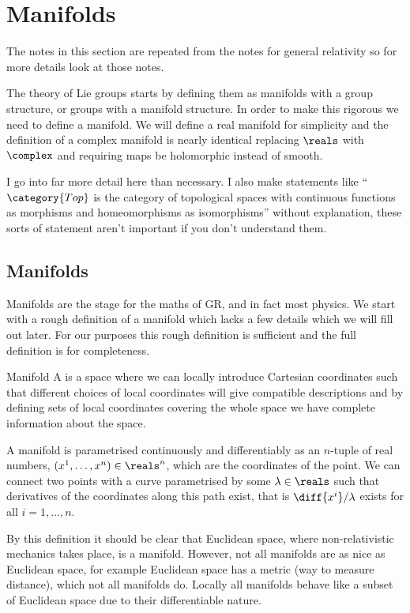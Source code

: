 \chapter{Manifolds}\label{app:manifold}
\begin{rmk}
    The notes in this section are repeated from the notes for general relativity so for more details look at those notes.
\end{rmk}
The theory of Lie groups starts by defining them as manifolds with a group structure, or groups with a manifold structure.
In order to make this rigorous we need to define a manifold.
We will define a real manifold for simplicity and the definition of a complex manifold is nearly identical replacing \(\reals\) with \(\complex\) and requiring maps be holomorphic instead of smooth.

I go into far more detail here than necessary.
I also make statements like \enquote{\(\category{Top}\) is the category of topological spaces with continuous functions as morphisms and homeomorphisms as isomorphisms} without explanation, these sorts of statement aren't important if you don't understand them.

\section{Manifolds}
Manifolds are the stage for the maths of GR, and in fact most physics.
We start with a rough definition of a manifold which lacks a few details which we will fill out later.
For our purposes this rough definition is sufficient and the full definition is for completeness.
\begin{dfn}{Manifold}{}
    A  is a space where we can locally introduce Cartesian coordinates such that different choices of local coordinates will give compatible descriptions and by defining sets of local coordinates covering the whole space we have complete information about the space.
\end{dfn}

A manifold is parametrised continuously and differentiably as an \(n\)-tuple of real numbers, \((x^1, \dotsc, x^n) \in \reals^n\), which are the coordinates of the point.
We can connect two points with a curve parametrised by some \(\lambda \in \reals\) such that derivatives of the coordinates along this path exist, that is \(\diff{x^i}/{\lambda}\) exists for all \(i = 1, \dotsc, n\).

By this definition it should be clear that Euclidean space, where non-relativistic mechanics takes place, is a manifold.
However, not all manifolds are as nice as Euclidean space, for example Euclidean space has a metric (way to measure distance), which not all manifolds do.
Locally all manifolds behave like a subset of Euclidean space due to their differentiable nature.

